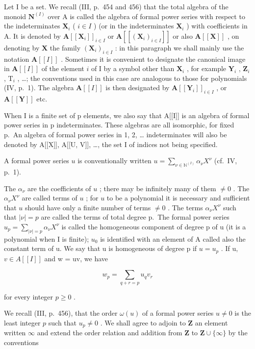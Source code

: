Let I be a set. We recall (III, p.~454 and 456) that the total algebra of the monoid \(\mathbf{N}^{(I)}\) over A is called the algebra of formal power series with respect to the indeterminates \(\mathbf{X}_i\) ( \(i \in I\) ) (or in the indeterminates \(\mathbf{X}_i\) ) with coefficients in A. It is denoted by \(\mathbf{A}[[\mathbf{X}_i]]_{i \in I}\) or \(\mathbf{A}[[(\mathbf{X}_i)_{i \in I}]]\) or also \(\mathbf{A}[[\mathbf{X}]]\) , on denoting by \(\mathbf{X}\) the family \((\mathbf{X}_i)_{i \in I}\) : in this paragraph we shall mainly use the notation \(\mathbf{A}[[I]]\) . Sometimes it is convenient to designate the canonical image in \(\mathbf{A}[[I]]\) of the element \(i\) of I by a symbol other than \(\mathbf{X}_i\) , for example \(\mathbf{Y}_i\) , \(\mathbf{Z}_i\) , \(\mathrm{T}_i\) , \ldots; the conventions used in this case are analogous to those for polynomials (IV, p.~1). The algebra \(\mathbf{A}[[I]]\) is then designated by \(\mathbf{A}[[\mathbf{Y}_i]]_{i \in I}\) , or \(\mathbf{A}[[\mathbf{Y}]]\) etc.

When I is a finite set of p elements, we also say that A{[}{[}I{]}{]} is an algebra of formal power series in p indeterminates. These algebras are all isomorphic, for fixed p.~An algebra of formal power series in 1, 2, \ldots{} indeterminates will also be denoted by A{[}{[}X{]}{]}, A{[}{[}U, V{]}{]}, \ldots, the set I of indices not being specified.

A formal power series \(u\) is conventionally written \(u = \sum_{\nu \in \mathbb{N}^{(I)}} \alpha_{\nu} X^{\nu}\) (cf.~IV, p.~1).

The \(\alpha_{\nu}\) are the coefficients of \(u\) ; there may be infinitely many of them \(\neq 0\) . The \(\alpha_{\nu}X^{\nu}\) are called terms of \(u\) ; for \(u\) to be a polynomial it is necessary and sufficient that \(u\) should have only a finite number of terms \(\neq 0\) . The terms \(\alpha_{\nu}X^{\nu}\) such that \(|\nu|=p\) are called the terms of total degree p.~The formal power series \(u_{p}=\sum_{|\nu|=p}\alpha_{\nu}X^{\nu}\) is called the homogeneous component of degree p of u (it is a polynomial when I is finite); \(u_{0}\) is identified with an element of A called also the constant term of u. We say that u is homogeneous of degree p if \(u = u_{p}\) . If u, \(v \in A[[I]]\) and w = uv, we have

\[
w _ {p} = \sum_ {q + r = p} u _ {q} v _ {r}\tag{1}
\]

for every integer \(p \geqslant 0\) .

We recall (III, p.~456), that the order \(\omega(u)\) of a formal power series \(u \neq 0\) is the least integer \(p\) such that \(u_p \neq 0\) . We shall agree to adjoin to \(\mathbf{Z}\) an element written \(\infty\) and extend the order relation and addition from \(\mathbf{Z}\) to \(\mathbf{Z} \cup \{\infty\}\) by the conventions

